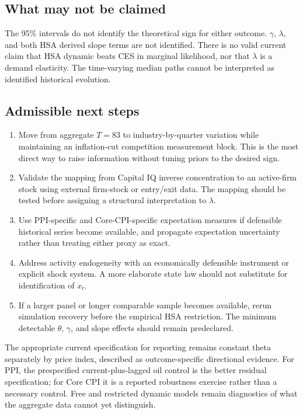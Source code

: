 \documentclass[11pt]{article}
\begin{document}
\subsection{What may not be claimed}

The 95\% intervals do not identify the theoretical sign for either outcome. $\gamma$,
$\lambda$, and both HSA derived slope terms are not identified. There is no valid current
claim that HSA dynamic beats CES in marginal likelihood, nor that $\lambda$ is a demand
elasticity. The time-varying median paths cannot be interpreted as identified historical
evolution.

\subsection{Admissible next steps}

\begin{enumerate}
\item Move from aggregate $T=83$ to industry-by-quarter variation while maintaining an
inflation-cut competition measurement block. This is the most direct way to raise information
without tuning priors to the desired sign.
\item Validate the mapping from Capital IQ inverse concentration to an active-firm stock using
external firm-stock or entry/exit data. The mapping should be tested before assigning a
structural interpretation to $\lambda$.
\item Use PPI-specific and Core-CPI-specific expectation measures if defensible historical
series become available, and propagate expectation uncertainty rather than treating either
proxy as exact.
\item Address activity endogeneity with an economically defensible instrument or explicit shock
system. A more elaborate state law should not substitute for identification of $x_t$.
\item If a larger panel or longer comparable sample becomes available, rerun simulation recovery
before the empirical HSA restriction. The minimum detectable $\theta$, $\gamma$, and slope
effects should remain predeclared.
\end{enumerate}

The appropriate current specification for reporting remains constant theta separately by
price index, described as outcome-specific directional evidence. For PPI, the prespecified
current-plus-lagged oil control is the better residual specification; for Core CPI it is a
reported robustness exercise rather than a necessary control. Free and restricted dynamic
models remain diagnostics of what the aggregate data cannot yet distinguish.
\end{document}
